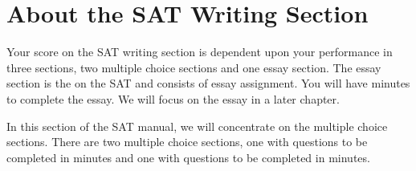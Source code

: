 \section{About the SAT Writing Section}

\begin{spacing}{1.5}
Your score on the SAT writing section is dependent upon your performance in three sections, two multiple choice sections and one essay section. The essay section is the \shortline on the SAT and consists of \shortline essay assignment. You will have \shortline minutes to complete the essay. We will focus on the essay in a later chapter. 

\bigskip
\sloppy In this section of the SAT manual, we will concentrate on the multiple choice sections. There are two multiple choice sections, one with \shortline questions to be completed in \shortline minutes and one with \shortline questions to be completed in \shortline minutes.
\end{spacing}